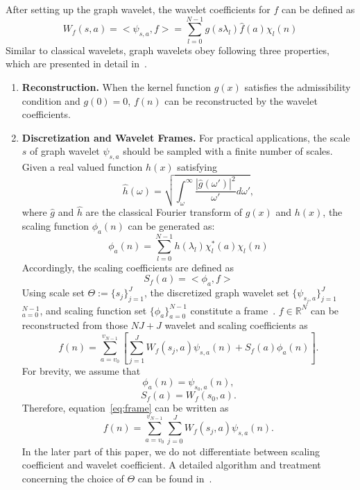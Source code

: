 \documentclass[twoside,leqno,twocolumn]{article}
\begin{document}
After setting up the graph wavelet, the wavelet coefficients for $f$ can be defined as
\begin{equation}
\label{eq:graph_graphwavelet}
W_f(s,a)=<\psi_{s,a}, f>=\sum\limits_{l=0}^{N-1}g(s\lambda_l)\hat{f}(a)\chi_l(n)
\end{equation}
Similar to classical wavelets, graph wavelets obey following three properties, which are presented in detail in~\cite{hammond2011wavelets}.
 \begin{enumerate}
 \item \textbf{Reconstruction.}
 When the kernel function $g(x)$ satisfies the admissibility condition and $g(0)=0$,  $f(n)$ can be reconstructed by the wavelet coefficients.
\item \textbf{Discretization and Wavelet Frames.} For practical applications, the
scale $s$ of graph wavelet $\psi_{s,a}$ should be sampled with a finite number of scales. Given a real valued function $h(x)$ satisfying
\begin{equation}
\hat{h}(\omega) = \sqrt{\int_\omega^\infty\frac{|\hat{g}(\omega')|^2}{\omega'}d{\omega'} },
\end{equation}
where $\hat{g}$ and $\hat{h}$ are the classical Fourier transform of $g(x)$ and $h(x)$, the scaling function $\phi_{a}(n)$ can be generated as:
\begin{equation}
\label{eq:graphscaledefinition}
\phi_{a}(n) = \sum\limits_{l=0}^{N-1}h(\lambda_l)\chi_l^*(a)\chi_l(n)
\end{equation}
Accordingly, the scaling coefficients are defined as
\begin{equation}
S_f(a)=<\phi_a,f>
\end{equation}
Using scale set $\Theta:=\{s_j\}_{j=1}^J$, the discretized graph wavelet set $\{\psi_{s_j,a}\}_{j=1}^{J}$ $_{a=0}^{N-1}$, and scaling function set $\{\phi_a\}_{a=0}^{N-1}$ constitute a frame~\cite{hammond2011wavelets}.
$f\in \mathbb{R}^N$ can be reconstructed from those $NJ+J$ wavelet and scaling coefficients as
\begin{equation}
\label{eq:frame}
f(n)=\sum_{a=v_0}^{v_{N-1}}[\sum_{j=1}^{J}W_{f}(s_j,a)\psi_{s,a}(n)+S_f(a)\phi_{a}(n)].
\end{equation}For brevity, we assume that
\begin{equation}
\phi_a(n)=\psi_{s_0,a}(n),
\end{equation}
\begin{equation}
S_f(a)=W_f(s_0,a).
\end{equation}Therefore, equation~\ref{eq:frame} can be written as
\begin{equation}
\label{eq:frame2}
f(n)=\sum_{a=v_0}^{v_{N-1}}\sum_{j=0}^{J}W_{f}(s_j,a)\psi_{s,a}(n).
\end{equation}In the later part of this paper, we do not differentiate between
scaling coefficient and wavelet coefficient.
A detailed algorithm and treatment concerning the choice of $\Theta$ can be found in~\cite{hammond2011wavelets}.


\end{enumerate}
\end{document}
